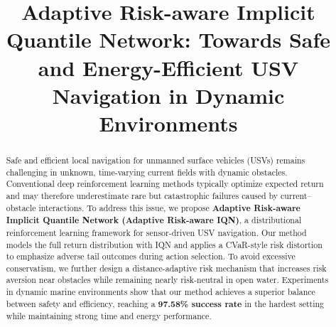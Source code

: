 \documentclass[runningheads]{llncs}
\begin{document}
%
\title{Adaptive Risk-aware Implicit Quantile Network: Towards Safe and Energy-Efficient USV Navigation in Dynamic Environments}
%
%
\maketitle              %
\begin{abstract}
Safe and efficient local navigation for unmanned surface vehicles (USVs) remains challenging in unknown, time-varying current fields with dynamic obstacles. Conventional deep reinforcement learning methods typically optimize expected return and may therefore underestimate rare but catastrophic failures caused by current--obstacle interactions. To address this issue, we propose \textbf{Adaptive Risk-aware Implicit Quantile Network (Adaptive Risk-aware IQN)}, a distributional reinforcement learning framework for sensor-driven USV navigation. Our method models the full return distribution with IQN and applies a CVaR-style risk distortion to emphasize adverse tail outcomes during action selection. To avoid excessive conservatism, we further design a distance-adaptive risk mechanism that increases risk aversion near obstacles while remaining nearly risk-neutral in open water. Experiments in dynamic marine environments show that our method achieves a superior balance between safety and efficiency, reaching a \textbf{97.58\% success rate} in the hardest setting while maintaining strong time and energy performance.
\end{abstract}
%
%
\end{document}

